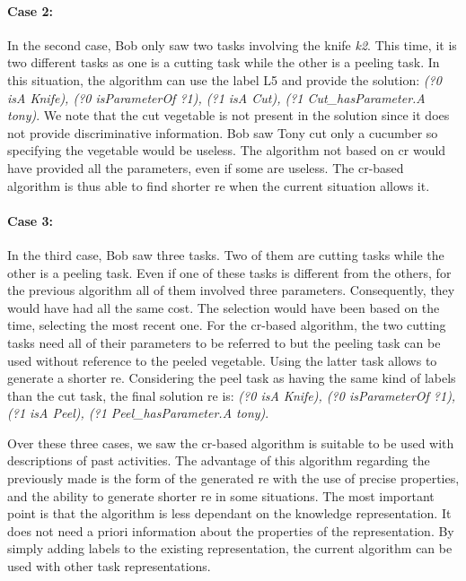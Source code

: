 \paragraph{Case 2:} In the second case, Bob only saw two tasks involving the knife \textit{k2}. This time, it is two different tasks as one is a cutting task while the other is a peeling task. In this situation, the algorithm can use the label L5 and provide the solution: \textit{(?0 isA Knife), (?0 isParameterOf ?1), (?1 isA Cut), (?1 Cut\_hasParameter.A tony)}. We note that the cut vegetable is not present in the solution since it does not provide discriminative information. Bob saw Tony cut only a cucumber so specifying the vegetable would be useless. The algorithm not based on \acrshort{cr} would have provided all the parameters, even if some are useless. The \acrshort{cr}-based algorithm is thus able to find shorter \acrshort{re} when the current situation allows it.

\paragraph{Case 3:} In the third case, Bob saw three tasks. Two of them are cutting tasks while the other is a peeling task. Even if one of these tasks is different from the others, for the previous algorithm all of them involved three parameters. Consequently, they would have had all the same cost. The selection would have been based on the time, selecting the most recent one. For the \acrshort{cr}-based algorithm, the two cutting tasks need all of their parameters to be referred to but the peeling task can be used without reference to the peeled vegetable. Using the latter task allows to generate a shorter \acrshort{re}. Considering the peel task as having the same kind of labels than the cut task, the final solution \acrshort{re} is: \textit{(?0 isA Knife), (?0 isParameterOf ?1), (?1 isA Peel), (?1 Peel\_hasParameter.A tony)}.

Over these three cases, we saw the \acrshort{cr}-based algorithm is suitable to be used with descriptions of past activities. The advantage of this algorithm regarding the previously made is the form of the generated \acrshort{re} with the use of precise properties, and the ability to generate shorter \acrshort{re} in some situations. The most important point is that the algorithm is less dependant on the knowledge representation. It does not need a priori information about the properties of the representation. By simply adding labels to the existing representation, the current algorithm can be used with other task representations.

